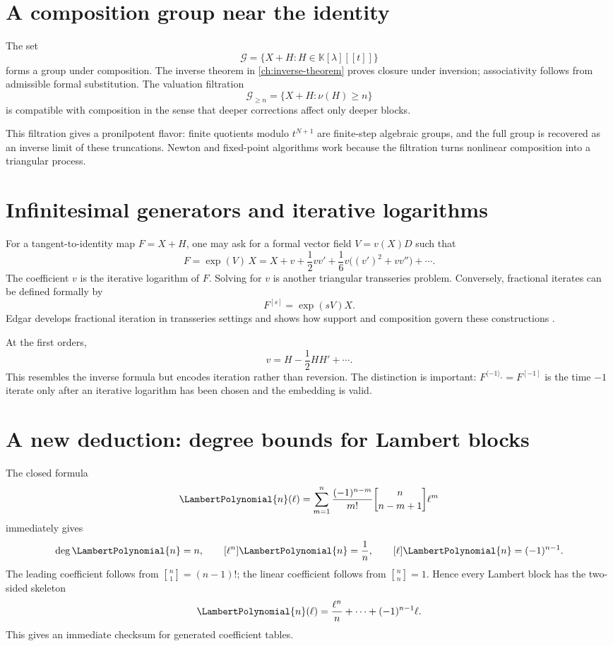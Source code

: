 \documentclass[11pt,openany]{book}
\theoremstyle{definition}
\theoremstyle{plain}
\theoremstyle{remark}
\newcommand{\K}{\mathbb{K}}
\newcommand{\invcomp}{^{\langle -1\rangle_{\circ}}}
\newcommand{\stirlingone}[2]{\genfrac{[}{]}{0pt}{}{#1}{#2}}
\newcommand{\val}{\nu}
\begin{document}
\section{A composition group near the identity}
The set
\[
 \mathcal G=\{X+H:H\in\K[\lambda][[t]]\}
\]
forms a group under composition. The inverse theorem in \cref{ch:inverse-theorem} proves closure under inversion; associativity follows from admissible formal substitution. The valuation filtration
\[
 \mathcal G_{\ge n}=\{X+H:\val(H)\ge n\}
\]
is compatible with composition in the sense that deeper corrections affect only deeper blocks.

This filtration gives a pronilpotent flavor: finite quotients modulo \(t^{N+1}\) are finite-step algebraic groups, and the full group is recovered as an inverse limit of these truncations. Newton and fixed-point algorithms work because the filtration turns nonlinear composition into a triangular process.


\section{Infinitesimal generators and iterative logarithms}
For a tangent-to-identity map \(F=X+H\), one may ask for a formal vector field \(V=v(X)D\) such that
\[
 F=\exp(V)\,X
 =X+v+\frac12v v'+\frac16v\bigl((v')^2+vv''\bigr)+\cdots.
\]
The coefficient \(v\) is the iterative logarithm of \(F\). Solving for \(v\) is another triangular transseries problem. Conversely, fractional iterates can be defined formally by
\[
 F^{[s]}=\exp(sV)X.
\]
Edgar develops fractional iteration in transseries settings and shows how support and composition govern these constructions \cite{edgar-fractional}.

At the first orders,
\[
 v=H-\frac12HH'+\cdots.
\]
This resembles the inverse formula but encodes iteration rather than reversion. The distinction is important: \(F\invcomp=F^{[-1]}\) is the time \(-1\) iterate only after an iterative logarithm has been chosen and the embedding is valid.

\section{A new deduction: degree bounds for Lambert blocks}
The closed formula
\[
 \LambertPolynomial{n}(\ell)=\sum_{m=1}^{n}
 \frac{(-1)^{n-m}}{m!}\stirlingone{n}{n-m+1}\ell^m
\]
immediately gives
\[
 \deg \LambertPolynomial{n}=n,
 \qquad
 [\ell^n]\LambertPolynomial{n}=\frac1n,
 \qquad
 [\ell]\LambertPolynomial{n}=(-1)^{n-1}.
\]
The leading coefficient follows from \(\stirlingone{n}{1}=(n-1)!\); the linear coefficient follows from \(\stirlingone{n}{n}=1\). Hence every Lambert block has the two-sided skeleton
\begin{equation}\label{eq:Pn-skeleton}
 \LambertPolynomial{n}(\ell)=\frac{\ell^n}{n}+\cdots+(-1)^{n-1}\ell.
\end{equation}
This gives an immediate checksum for generated coefficient tables.
\end{document}
